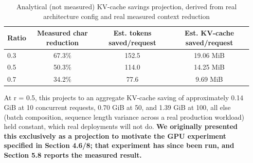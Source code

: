 \begin{table}[htbp]
\caption{Analytical (not measured) KV-cache savings projection, derived from real architecture config and real measured context reduction}
\label{tab:7}
\centering
\footnotesize
\setlength{\tabcolsep}{3.5pt}
\begin{tabular}{lccc}
\toprule
Ratio & Measured char reduction & Est. tokens saved/request & Est. KV-cache saved/request \\
\midrule
0.3 & 67.3\% & 152.5 & 19.06 MiB \\
0.5 & 50.3\% & 114.0 & 14.25 MiB \\
0.7 & 34.2\% & 77.6 & 9.69 MiB \\
\bottomrule
\end{tabular}
\end{table}
At r = 0.5, this projects to an aggregate KV-cache saving of approximately 0.14 GiB at 10 concurrent requests, 0.70 GiB at 50, and 1.39 GiB at 100, all else (batch composition, sequence length variance across a real production workload) held constant, which real deployments will not do. \textbf{We originally presented this exclusively as a projection to motivate the GPU experiment specified in Section 4.6/8; that experiment has since been run, and Section 5.8 reports the measured result.}


